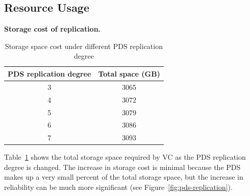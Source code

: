 



\subsection{Resource Usage}
{\bf Storage cost of replication.}
\begin{table}
    \begin{tabular}{|c|c|}
    \hline
    PDS replication degree & Total space (GB) \\ \hline
    3                      & 3065             \\ \hline
    4                      & 3072             \\ \hline
    5                      & 3079             \\ \hline
    6                      & 3086             \\ \hline
    7                      & 3093             \\ \hline
    \end{tabular}
\caption{Storage space cost under different PDS replication degree}
\label{tab:replication_cost}
\end{table}

Table~\ref{tab:replication_cost} shows the total storage space required by VC as the PDS replication degree is changed. The increase in storage cost is minimal because the PDS makes up a very small percent of the total storage space, but the increase in reliability can be much more significant (see Figure~\ref{fig:pds-replication}).

